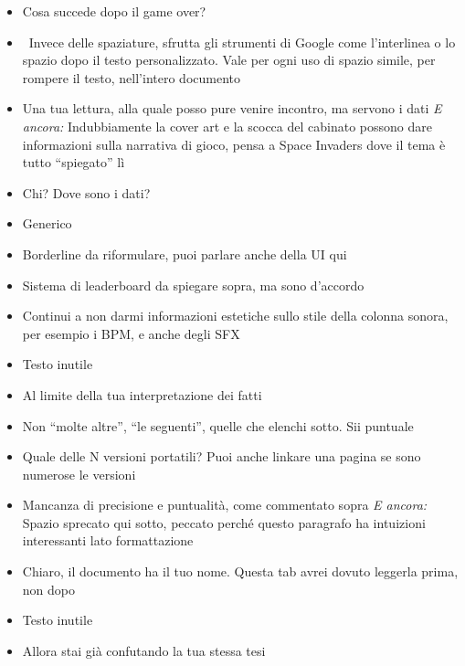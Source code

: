 {\begin{itemize}
  \item {} Cosa succede dopo il game over?
  \item \rvVuoto\ Invece delle spaziature, sfrutta gli strumenti di Google come l'interlinea o lo spazio dopo il testo personalizzato. Vale per ogni uso di spazio simile, per rompere il testo, nell'intero documento
  \item {} Una tua lettura, alla quale posso pure venire incontro, ma servono i dati \emph{E ancora:} Indubbiamente la cover art e la scocca del cabinato possono dare informazioni sulla narrativa di gioco, pensa a Space Invaders dove il tema è tutto ``spiegato'' lì
  \item {} Chi? Dove sono i dati?
  \item {} Generico
  \item {} Borderline da riformulare, puoi parlare anche della UI qui
  \item {} Sistema di leaderboard da spiegare sopra, ma sono d'accordo
  \item {} Continui a non darmi informazioni estetiche sullo stile della colonna sonora, per esempio i BPM, e anche degli SFX
  \item {} Testo inutile
  \item {} Al limite della tua interpretazione dei fatti
  \item {} Non ``molte altre'', ``le seguenti'', quelle che elenchi sotto. Sii puntuale
  \item {} Quale delle N versioni portatili? Puoi anche linkare una pagina se sono numerose le versioni
  \item {} Mancanza di precisione e puntualità, come commentato sopra \emph{E ancora:} Spazio sprecato qui sotto, peccato perché questo paragrafo ha intuizioni interessanti lato formattazione
  \item {} Chiaro, il documento ha il tuo nome. Questa tab avrei dovuto leggerla prima, non dopo
  \item {} Testo inutile
  \item {} Allora stai già confutando la tua stessa tesi

\end{itemize}}
